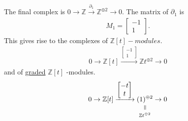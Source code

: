 \documentclass[11pt,a4paper]{report}
\newcommand{\verteq}{\rotatebox{90}{$\,=$}}
\newcommand{\equalto}[2]{\underset{\scriptstyle\overset{\mkern4mu\verteq}{#2}}{#1}}
\begin{document}
\begin{Ex}
              The final complex is $0 \rightarrow \mathbb{Z} \xrightarrow{\partial_1} \mathbb{Z}^{\oplus2} \rightarrow 0$. The matrix of $\partial_1$ is \begin{align*}M_1 = \begin{bmatrix}-1\\1\end{bmatrix}.\end{align*}
              This gives rise to the complexes of $\mathbb{Z}[t] - modules$.\\
              \begin{align*}
                0 \rightarrow \mathbb{Z}[t] \xrightarrow{\begin{bmatrix}-1\\1\end{bmatrix}} \mathbb{Z}t^{\oplus2} \rightarrow 0
              \end{align*}
              and of \underline{graded} $\mathbb{Z}[t]$ -modules.
              \begin{align*}
                0 \rightarrow \mathbb{Z}[t] \xrightarrow{\begin{bmatrix}-t\\t\end{bmatrix}} \equalto{(1)^{\oplus2}}{\mathbb{Z}t^{\oplus2}} \rightarrow 0
              \end{align*}

              \end{Ex}
\end{document}
